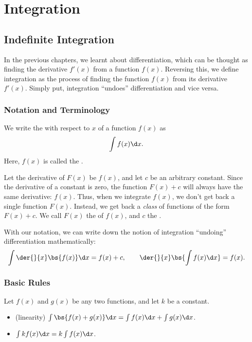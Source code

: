 \chapter{Integration}

\section{Indefinite Integration}

In the previous chapters, we learnt about differentiation, which can be thought as finding the derivative $f'(x)$ from a function $f(x)$. Reversing this, we define integration as the process of finding the function $f(x)$ from its derivative $f'(x)$. Simply put, integration ``undoes'' differentiation and vice versa.

\subsection{Notation and Terminology}

\begin{definition}
    We write the  with respect to $x$ of a function $f(x)$ as \[\int f(x) \d x.\] Here, $f(x)$ is called the .
\end{definition}

Let the derivative of $F(x)$ be $f(x)$, and let $c$ be an arbitrary constant. Since the derivative of a constant is zero, the function $F(x) + c$ will always have the same derivative: $f(x)$. Thus, when we integrate $f(x)$, we don't get back a single function $F(x)$. Instead, we get back a \textit{class} of functions of the form $F(x) + c$. We call $F(x)$ the  of $f(x)$, and $c$ the .

With our notation, we can write down the notion of integration ``undoing'' differentiation mathematically: \[\int \der{}{x} \bs{f(x)} \d x = f(x) + c, \qquad \der{}{x} \bs{\int f(x) \d x} = f(x).\]

\subsection{Basic Rules}

\begin{fact}
    Let $f(x)$ and $g(x)$ be any two functions, and let $k$ be a constant.
    \begin{itemize}
        \item (linearity) $\int \bs{f(x) + g(x)} \d x = \int f(x) \d x + \int g(x) \d x$.
        \item $\int k f(x) \d x = k \int f(x) \d x$.
    \end{itemize}
\end{fact}

